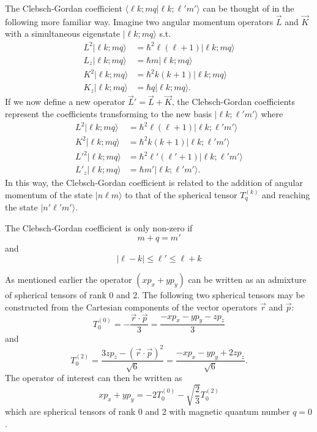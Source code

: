 \documentclass[preprint,12pt]{elsarticle}
\begin{document}
The Clebsch-Gordan coefficient $\langle\ell k;mq|\ell
k;\ell'm'\rangle$ can be thought of in the following more familiar
way.  Imagine two angular momentum operators $\vec{L}$ and $\vec{K}$
with a simultaneous eigenstate $|\ell k;mq\rangle$ s.t.
\begin{align}
L^2|\ell k;mq\rangle&=\hbar^2\ell(\ell+1)|\ell k;mq\rangle\\
L_z|\ell k;mq\rangle&=\hbar m|\ell k;mq\rangle\\
K^2|\ell k;mq\rangle&=\hbar^2k(k+1)|\ell k;mq\rangle\\
K_z|\ell k;mq\rangle&=\hbar q|\ell k;mq\rangle.
\end{align}
If we now define a new operator $\vec{L}'=\vec{L}+\vec{K}$, the
Clebsch-Gordan coefficients represent the coefficients transforming to
the new basis $|\ell k;\ell'm'\rangle$ where
\begin{align}
L^2|\ell k;mq\rangle&=\hbar^2\ell(\ell+1)|\ell k;\ell'm'\rangle\\
K^2|\ell k;mq\rangle&=\hbar^2k(k+1)|\ell k;\ell'm'\rangle\\
L'^2|\ell k;mq\rangle&=\hbar^2\ell'(\ell'+1)|\ell k;\ell'm'\rangle\\
L'_z|\ell k;mq\rangle&=\hbar m'|\ell k;\ell'm'\rangle.
\end{align}
In this way, the Clebsch-Gordan coefficient is related to the addition
of angular momentum of the state $|n\ell m\rangle$ to that of the
spherical tensor $T_q^{(k)}$ and reaching the state
$|n'\ell'm'\rangle$.

The Clebsch-Gordan coefficient is only non-zero if
\begin{equation}
  \label{eq:z}
  m+q=m'
\end{equation}
and
\begin{equation}
\label{eq:ell}
  |\ell-k|\leq\ell'\leq\ell+k
\end{equation}

As mentioned earlier the operator $(xp_x+yp_y)$ can be written as an
admixture of spherical tensors of rank 0 and 2.  The following two
spherical tensors may be constructed from the Cartesian components of
the vector operators $\vec{r}$ and $\vec{p}$:
\begin{equation}
T_0^{(0)}=-\frac{\vec{r}\cdot\vec{p}}{3}=\frac{-xp_x-yp_y-zp_z}{3}
\end{equation}
and
\begin{equation}
T_0^{(2)}=\frac{3zp_z-(\vec{r}\cdot\vec{p})^2}{\sqrt{6}}=\frac{-xp_x-yp_y+2zp_z}{\sqrt{6}}.
\end{equation}
The operator of interest can then be written as
\begin{equation}
xp_x+yp_y=-2T_0^{(0)}-\sqrt{\frac{2}{3}}T_0^{(2)}
\end{equation}
which are spherical tensors of rank 0 and 2 with magnetic quantum
number $q=0$.
\end{document}
